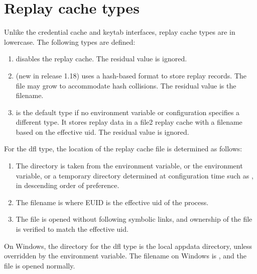 \documentclass[letterpaper,10pt,english]{sphinxmanual}
\begin{document}
\section{Replay cache types}
\label{\detokenize{basic/rcache_def:replay-cache-types}}
Unlike the credential cache and keytab interfaces, replay cache types
are in lowercase.  The following types are defined:
\begin{enumerate}
\item {} 
 disables the replay cache.  The residual value is ignored.

\item {} 
 (new in release 1.18) uses a hash-based format to store
replay records.  The file may grow to accommodate hash collisions.
The residual value is the filename.

\item {} 
 is the default type if no environment variable or
configuration specifies a different type.  It stores replay data in
a file2 replay cache with a filename based on the effective uid.
The residual value is ignored.

\end{enumerate}

For the dfl type, the location of the replay cache file is determined
as follows:
\begin{enumerate}
\item {} 
The directory is taken from the  environment
variable, or the  environment variable, or a temporary
directory determined at configuration time such as , in
descending order of preference.

\item {} 
The filename is  where EUID is the effective
uid of the process.

\item {} 
The file is opened without following symbolic links, and ownership
of the file is verified to match the effective uid.

\end{enumerate}

On Windows, the directory for the dfl type is the local appdata
directory, unless overridden by the  environment
variable.  The filename on Windows is , and the file
is opened normally.
\end{document}
